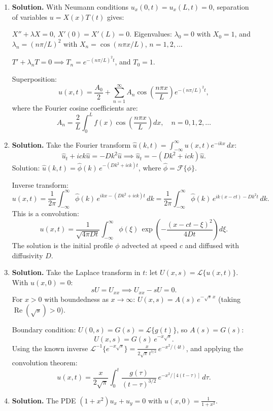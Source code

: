 \begin{enumerate}
\item \textbf{Solution.}
With Neumann conditions $u_x(0,t)=u_x(L,t)=0$, separation of variables $u=X(x)T(t)$ gives:

$X''+\lambda X=0$, $X'(0)=X'(L)=0$. Eigenvalues: $\lambda_0=0$ with $X_0=1$, and $\lambda_n=(n\pi/L)^2$ with $X_n=\cos(n\pi x/L)$, $n=1,2,\ldots$

$T'+\lambda_n T=0 \implies T_n=e^{-(n\pi/L)^2 t}$, and $T_0=1$.

Superposition:
\[
u(x,t)=\frac{A_0}{2}+\sum_{n=1}^{\infty}A_n\cos\!\left(\frac{n\pi x}{L}\right)e^{-(n\pi/L)^2 t},
\]
where the Fourier cosine coefficients are:
\[
\boxed{A_n = \frac{2}{L}\int_0^L f(x)\cos\!\left(\frac{n\pi x}{L}\right)dx, \quad n=0,1,2,\ldots}
\]

\item \textbf{Solution.}
Take the Fourier transform $\hat{u}(k,t)=\int_{-\infty}^{\infty}u(x,t)e^{-ikx}\,dx$:
\[
\hat{u}_t + ick\hat{u}=-Dk^2\hat{u} \implies \hat{u}_t = -(Dk^2+ick)\hat{u}.
\]
Solution: $\hat{u}(k,t)=\hat{\phi}(k)\,e^{-(Dk^2+ick)t}$, where $\hat{\phi}=\mathcal{F}\{\phi\}$.

Inverse transform:
\[
u(x,t)=\frac{1}{2\pi}\int_{-\infty}^{\infty}\hat{\phi}(k)\,e^{ikx-(Dk^2+ick)t}\,dk = \frac{1}{2\pi}\int_{-\infty}^{\infty}\hat{\phi}(k)\,e^{ik(x-ct)-Dk^2t}\,dk.
\]
This is a convolution:
\[
\boxed{u(x,t)=\frac{1}{\sqrt{4\pi Dt}}\int_{-\infty}^{\infty}\phi(\xi)\,\exp\!\left(-\frac{(x-ct-\xi)^2}{4Dt}\right)d\xi}.
\]
The solution is the initial profile $\phi$ advected at speed $c$ and diffused with diffusivity $D$.

\item \textbf{Solution.}
Take the Laplace transform in $t$: let $U(x,s)=\mathcal{L}\{u(x,t)\}$. With $u(x,0)=0$:
\[
sU = U_{xx} \implies U_{xx}-sU=0.
\]
For $x>0$ with boundedness as $x\to\infty$: $U(x,s)=A(s)\,e^{-\sqrt{s}\,x}$ (taking $\operatorname{Re}(\sqrt{s})>0$).

Boundary condition: $U(0,s)=G(s)=\mathcal{L}\{g(t)\}$, so $A(s)=G(s)$:
\[
U(x,s)=G(s)\,e^{-x\sqrt{s}}.
\]
Using the known inverse $\mathcal{L}^{-1}\{e^{-x\sqrt{s}}\}=\frac{x}{2\sqrt{\pi}\,t^{3/2}}\,e^{-x^2/(4t)}$, and applying the convolution theorem:
\[
\boxed{u(x,t)=\frac{x}{2\sqrt{\pi}}\int_0^t \frac{g(\tau)}{(t-\tau)^{3/2}}\,e^{-x^2/[4(t-\tau)]}\,d\tau}.
\]

\item \textbf{Solution.}
The PDE $(1+x^2)u_x+u_y=0$ with $u(x,0)=\frac{1}{1+x^2}$.


\end{enumerate}
